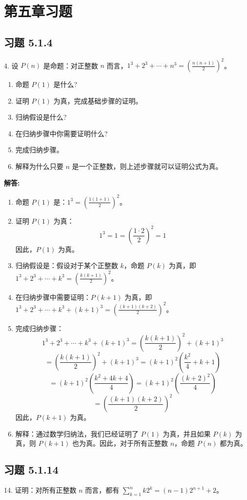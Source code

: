 \documentclass[UTF8]{report}
\theoremstyle{MyLineTheoremStyle} %
\theoremstyle{MyBlockTheoremStyle} %
\theoremstyle{MySubsubsectionStyle} %
\begin{document}
\chapter{第五章习题}

\section{习题 5.1.4}
4. 设 $P(n)$ 是命题：对正整数 $n$ 而言，$1^3 + 2^3 + \cdots + n^3 = \left(\frac{n(n+1)}{2}\right)^2$。
\begin{enumerate}
    \item 命题 $P(1)$ 是什么?
    \item 证明 $P(1)$ 为真，完成基础步骤的证明。
    \item 归纳假设是什么?
    \item 在归纳步骤中你需要证明什么?
    \item 完成归纳步骤。
    \item 解释为什么只要 $n$ 是一个正整数，则上述步骤就可以证明公式为真。
\end{enumerate}

\textbf{解答:}
\begin{enumerate}
    \item 命题 $P(1)$ 是：$1^3 = \left(\frac{1(1+1)}{2}\right)^2$。
    \item 证明 $P(1)$ 为真：
    \[
    1^3 = 1 = \left(\frac{1 \cdot 2}{2}\right)^2 = 1
    \]
    因此，$P(1)$ 为真。
    \item 归纳假设是：假设对于某个正整数 $k$，命题 $P(k)$ 为真，即 $1^3 + 2^3 + \cdots + k^3 = \left(\frac{k(k+1)}{2}\right)^2$。
    \item 在归纳步骤中需要证明：$P(k+1)$ 为真，即 $1^3 + 2^3 + \cdots + k^3 + (k+1)^3 = \left(\frac{(k+1)(k+2)}{2}\right)^2$。
    \item 完成归纳步骤：
    \[
    1^3 + 2^3 + \cdots + k^3 + (k+1)^3 = \left(\frac{k(k+1)}{2}\right)^2 + (k+1)^3
    \]
    \[
    = \left(\frac{k(k+1)}{2}\right)^2 + (k+1)^3 = (k+1)^2 \left(\frac{k^2}{4} + k + 1\right)
    \]
    \[
    = (k+1)^2 \left(\frac{k^2 + 4k + 4}{4}\right) = (k+1)^2 \left(\frac{(k+2)^2}{4}\right)
    \]
    \[
    = \left(\frac{(k+1)(k+2)}{2}\right)^2
    \]
    因此，$P(k+1)$ 为真。
    \item 解释：通过数学归纳法，我们已经证明了 $P(1)$ 为真，并且如果 $P(k)$ 为真，则 $P(k+1)$ 也为真。因此，对于所有正整数 $n$，命题 $P(n)$ 都为真。
\end{enumerate}

\section{习题 5.1.14}
14. 证明：对所有正整数 $n$ 而言，都有 $\sum_{k=1}^{n} k 2^k = (n-1) 2^{n+1} + 2$。
\end{document}
